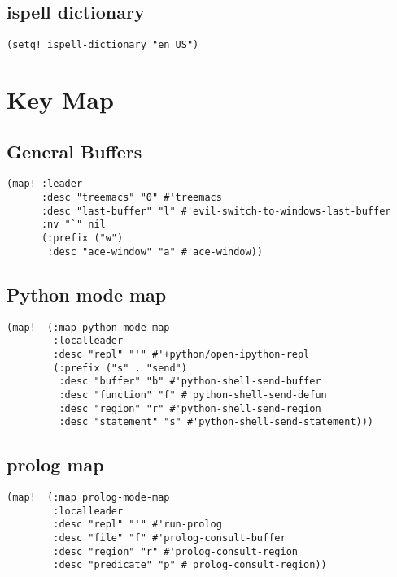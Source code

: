 \documentclass{assignments}
\begin{document}
\subsection*{ispell dictionary}
\label{sec:org7200548}
\begin{verbatim}
(setq! ispell-dictionary "en_US")
\end{verbatim}

\section*{Key Map}
\label{sec:org5e0ecf2}
\subsection*{General Buffers}
\label{sec:org6ddc57f}
\begin{verbatim}
(map! :leader
      :desc "treemacs" "0" #'treemacs
      :desc "last-buffer" "l" #'evil-switch-to-windows-last-buffer
      :nv "`" nil
      (:prefix ("w")
       :desc "ace-window" "a" #'ace-window))
\end{verbatim}
\subsection*{Python mode map}
\label{sec:org464cd4f}
\begin{verbatim}
(map!  (:map python-mode-map
        :localleader
        :desc "repl" "'" #'+python/open-ipython-repl
        (:prefix ("s" . "send")
         :desc "buffer" "b" #'python-shell-send-buffer
         :desc "function" "f" #'python-shell-send-defun
         :desc "region" "r" #'python-shell-send-region
         :desc "statement" "s" #'python-shell-send-statement)))
\end{verbatim}
\subsection*{prolog map}
\label{sec:org53bae5e}
\begin{verbatim}
(map!  (:map prolog-mode-map
        :localleader
        :desc "repl" "'" #'run-prolog
        :desc "file" "f" #'prolog-consult-buffer
        :desc "region" "r" #'prolog-consult-region
        :desc "predicate" "p" #'prolog-consult-region))
\end{verbatim}
\end{document}
